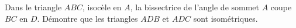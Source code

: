 %
%
    Dans le triangle $ABC$, isocèle en $A$, la bissectrice de l'angle de sommet $A$ coupe $BC$ en $D$. Démontre que les triangles $ADB$ et $ADC$ sont isométriques.\\
    \begin{center}
        
    \end{center}
